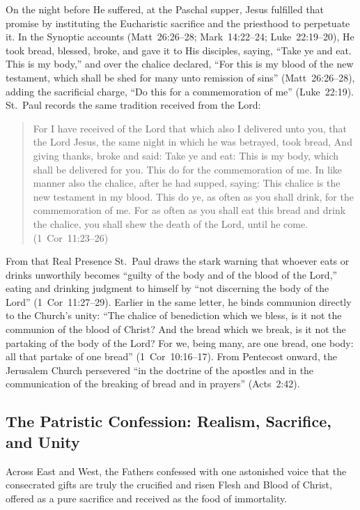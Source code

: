 On the night before He suffered, at the Paschal supper, Jesus fulfilled that promise by instituting the Eucharistic sacrifice and the priesthood to perpetuate it. In the Synoptic accounts (Matt~26:26--28; Mark~14:22--24; Luke~22:19--20), He took bread, blessed, broke, and gave it to His disciples, saying, ``Take ye and eat. This is my body,'' and over the chalice declared, ``For this is my blood of the new testament, which shall be shed for many unto remission of sins'' (Matt~26:26--28), adding the sacrificial charge, ``Do this for a commemoration of me'' (Luke~22:19). St.~Paul records the same tradition received from the Lord:
\begin{quotation}
For I have received of the Lord that which also I delivered unto you, that the Lord Jesus, the same night in which he was betrayed, took bread, And giving thanks, broke and said: Take ye and eat: This is my body, which shall be delivered for you. This do for the commemoration of me. In like manner also the chalice, after he had supped, saying: This chalice is the new testament in my blood. This do ye, as often as you shall drink, for the commemoration of me. For as often as you shall eat this bread and drink the chalice, you shall shew the death of the Lord, until he come. (1~Cor~11:23--26)
\end{quotation}
From that Real Presence St.~Paul draws the stark warning that whoever eats or drinks unworthily becomes ``guilty of the body and of the blood of the Lord,'' eating and drinking judgment to himself by ``not discerning the body of the Lord'' (1~Cor~11:27--29). Earlier in the same letter, he binds communion directly to the Church's unity: ``The chalice of benediction which we bless, is it not the communion of the blood of Christ? And the bread which we break, is it not the partaking of the body of the Lord? For we, being many, are one bread, one body: all that partake of one bread'' (1~Cor~10:16--17). From Pentecost onward, the Jerusalem Church persevered ``in the doctrine of the apostles and in the communication of the breaking of bread and in prayers'' (Acts~2:42).

\subsection{The Patristic Confession: Realism, Sacrifice, and Unity}
\label{subsec:eucharist-fathers}

Across East and West, the Fathers confessed with one astonished voice that the consecrated gifts are truly the crucified and risen Flesh and Blood of Christ, offered as a pure sacrifice and received as the food of immortality.

